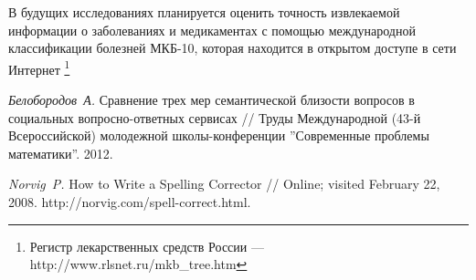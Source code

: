 ﻿\documentclass{article}
\begin{document}
В будущих исследованиях планируется оценить точность извлекаемой информации о заболеваниях и медикаментах с помощью международной классификации болезней МКБ-10, которая находится в открытом доступе в сети Интернет \footnote{Регистр лекарственных средств России --- http://www.rlsnet.ru/mkb_tree.htm}%

\begin{thebibliography}{3}


{\it Белобородов~А.} Сравнение трех мер семантической близости вопросов в социальных вопросно-ответных сервисах // Труды Международной (43-й Всероссийской) молодежной школы-конференции ''Современные проблемы математики''. 2012.

{\it Norvig~P.} How to Write a Spelling Corrector // Online; visited February 22, 2008. http://norvig.com/spell-correct.html.

\end{thebibliography}
\end{document}
